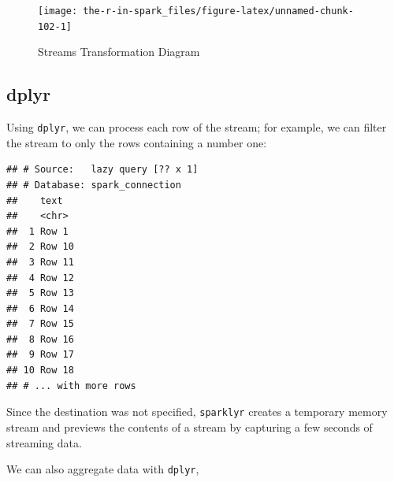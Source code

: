\documentclass[]{book}
\newenvironment{Shaded}{\begin{snugshade}}{\end{snugshade}}
\newcommand{\DataTypeTok}[1]{\textcolor[rgb]{0.13,0.29,0.53}{#1}}
\newcommand{\KeywordTok}[1]{\textcolor[rgb]{0.13,0.29,0.53}{\textbf{#1}}}
\newcommand{\NormalTok}[1]{#1}
\newcommand{\OperatorTok}[1]{\textcolor[rgb]{0.81,0.36,0.00}{\textbf{#1}}}
\newcommand{\OtherTok}[1]{\textcolor[rgb]{0.56,0.35,0.01}{#1}}
\newcommand{\StringTok}[1]{\textcolor[rgb]{0.31,0.60,0.02}{#1}}
\theoremstyle{definition}
\theoremstyle{definition}
\theoremstyle{definition}
\theoremstyle{remark}
\begin{document}
\begin{figure}

{\centering \texttt{[image: the-r-in-spark\_files/figure-latex/unnamed-chunk-102-1]} 

}

\caption{Streams Transformation Diagram}\label{fig:unnamed-chunk-102}
\end{figure}

\hypertarget{streams-dplyr}{%
\subsection{dplyr}\label{streams-dplyr}}

Using \texttt{dplyr}, we can process each row of the stream; for
example, we can filter the stream to only the rows containing a number
one:

\begin{Shaded}
\end{Shaded}

\begin{verbatim}
## # Source:   lazy query [?? x 1]
## # Database: spark_connection
##    text  
##    <chr> 
##  1 Row 1 
##  2 Row 10
##  3 Row 11
##  4 Row 12
##  5 Row 13
##  6 Row 14
##  7 Row 15
##  8 Row 16
##  9 Row 17
## 10 Row 18
## # ... with more rows
\end{verbatim}

Since the destination was not specified, \texttt{sparklyr} creates a
temporary memory stream and previews the contents of a stream by
capturing a few seconds of streaming data.

We can also aggregate data with \texttt{dplyr},

\begin{Shaded}
\end{Shaded}
\end{document}
